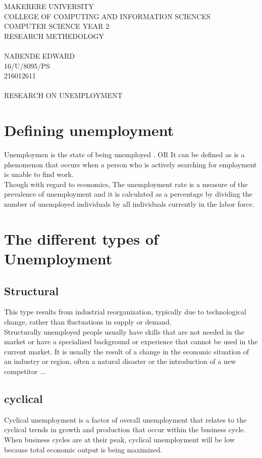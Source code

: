 \documentclass[a4paper, 12pt]{article}
\begin{document}
MAKERERE UNIVERSITY\\
COLLEGE OF COMPUTING AND INFORMATION SCIENCES\\
COMPUTER SCIENCE YEAR 2\\
RESEARCH METHEDOLOGY\\ \\

NABENDE EDWARD\\
\textmd{16/U/8095/PS}\\
\textmd{216012611}\\ \\

                                RESEARCH ON UNEMPLOYMENT \\
\section{Defining unemployment}

Unemploymen is the state of being unemployed . OR It can be defined as  is a phenomenon that occurs when a person who is actively searching for employment is unable to find work.\\
Though with regard to economics, The unemployment rate is a measure of the prevalence of unemployment and it is calculated as a percentage by dividing the number of unemployed individuals by all individuals currently in the labor force.
\section{The different types of Unemployment}
\subsection{Structural}
This type  results  from industrial reorganization, typically due to technological change, rather than fluctuations in supply or demand.\\
Structurally unemployed people usually have skills that are not needed in the market or have a specialized background or experience that cannot be used in the current market. It is usually the result of a change in the economic situation of an industry or region, often a natural disaster or the introduction of a new competitor ...

\subsection{cyclical}
Cyclical unemployment is a factor of overall unemployment that relates to the cyclical trends in growth and production that occur within the business cycle. When business cycles are at their peak, cyclical unemployment will be low because total economic output is being maximized.
\end{document}
